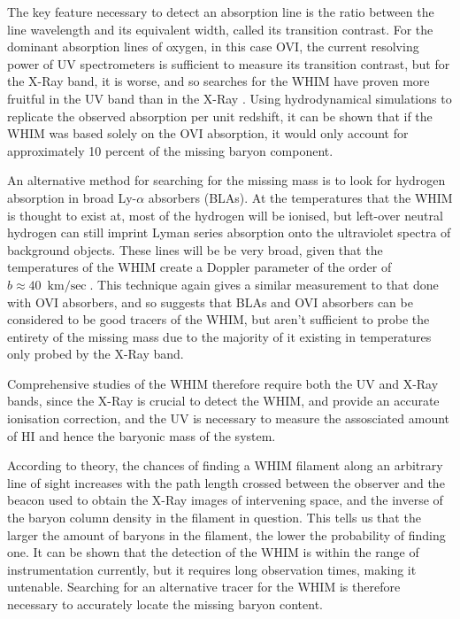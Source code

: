 \par The key feature necessary to detect an absorption line is the ratio between the line wavelength and its equivalent width, called its transition contrast. For the dominant absorption lines of oxygen, in this case OVI, the current resolving power of UV spectrometers is sufficient to measure its transition contrast, but for the X-Ray band, it is worse, and so searches for the WHIM have proven more fruitful in the UV band than in the X-Ray \citep{2005ApJ...624..555D,2006A&A...445..827R}. Using hydrodynamical simulations to replicate the observed absorption per unit redshift, it can be shown that if the WHIM was based solely on the OVI absorption, it would only account for approximately 10 percent of the missing baryon component. 

\par An alternative method for searching for the missing mass is to look for hydrogen absorption in broad Ly-$\alpha$ absorbers (BLAs). At the temperatures that the WHIM is thought to exist at, most of the hydrogen will be ionised, but left-over neutral hydrogen can still imprint Lyman series absorption onto the ultraviolet spectra of background objects. These lines will be be very broad, given that the temperatures of the WHIM create a Doppler parameter of the order of $b\approx \SI{40}{\kilo\meter\per\sec}$. This technique again gives  a similar measurement to that done with OVI absorbers, and so suggests that BLAs and OVI absorbers can be considered to be good tracers of the WHIM, but aren't sufficient to probe the entirety of the missing mass due to the majority of it existing in temperatures only probed by the X-Ray band. 

\par Comprehensive studies of the WHIM therefore require both the UV and X-Ray bands, since the X-Ray is crucial to detect the WHIM, and provide an accurate ionisation correction, and the UV is necessary to measure the assosciated amount of HI and hence the baryonic mass of the system. 

\par According to theory, the chances of finding a WHIM filament along an arbitrary line of sight increases with the path length crossed between the observer and the beacon used to obtain the X-Ray images of intervening space, and the inverse of the baryon column density in the filament in question. This tells us that the larger the amount of baryons in the filament, the lower the probability of finding one. It can be shown that the detection of the WHIM is within the range of instrumentation currently, but it requires long observation times, making it untenable. Searching for an alternative tracer for the WHIM is therefore necessary to accurately locate the missing baryon content.


